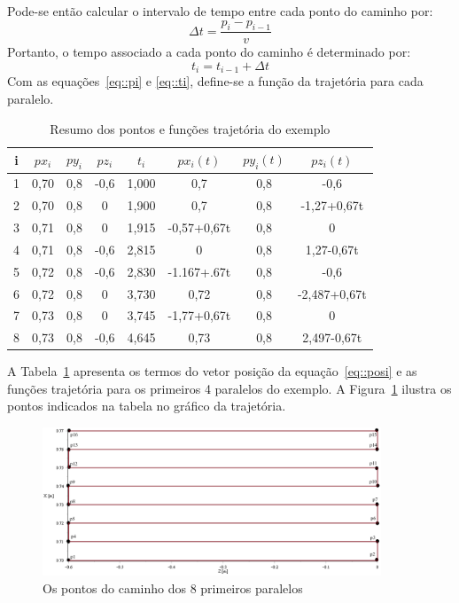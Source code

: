 Pode-se então calcular o intervalo de tempo entre cada ponto do caminho por:
%
\begin{equation} \label{eq::dt}
	\Delta t = \frac{p_i - p_{i-1}}{v}
\end{equation}
%
Portanto, o tempo associado a cada ponto do caminho é determinado por:
%
\begin{equation} \label{eq::ti}
	t_i = t_{i-1} + \Delta t
\end{equation}
%
Com as equações~\ref{eq::pi} e \ref{eq::ti}, define-se a função da trajetória
para cada paralelo.
%
\begin{table}[h]
\centering
\caption{Resumo dos pontos e funções trajetória do exemplo}
\label{tab::func_paralelos}
\begin{tabular}{|c|c|c|c|c||c|c|c|}
\hline
i & $px_i$ & $py_i$ & $pz_i$ & $t_i$  & $px_i(t)$    & $py_i(t)$ &
$pz_i(t)$
\\ \hline \hline
1       & 0,70  & 0,8   & -0,6  & 1,000 & 0,7         & 0,8      & -0,6         \\ \hline
2       & 0,70  & 0,8   & 0     & 1,900 & 0,7         & 0,8      & -1,27+0,67t  \\ \hline
3       & 0,71  & 0,8   & 0     & 1,915 & -0,57+0,67t & 0,8      & 0            \\ \hline
4       & 0,71  & 0,8   & -0,6  & 2,815 & 0           & 0,8      & 1,27-0,67t   \\ \hline
5       & 0,72  & 0,8   & -0,6  & 2,830 & -1.167+.67t & 0,8      & -0,6         \\ \hline
6       & 0,72  & 0,8   & 0     & 3,730 & 0,72        & 0,8      & -2,487+0,67t \\ \hline
7       & 0,73  & 0,8   & 0     & 3,745 & -1,77+0,67t & 0,8      & 0            \\ \hline
8       & 0,73  & 0,8   & -0,6  & 4,645 & 0,73        & 0,8      & 2,497-0,67t  \\ \hline
\end{tabular}
\end{table}
%

A Tabela~\ref{tab::func_paralelos} apresenta os termos do vetor posição da
equação~\ref{eq::posi} e as funções trajetória para os primeiros 4 paralelos do
exemplo. A Figura~\ref{fig::pontos_exemplo} ilustra os pontos indicados na
tabela no gráfico da trajetória.

\begin{figure}
	\centering 
 	\includegraphics[width=0.90\textwidth]{figs/pontos_exemplo}
 	\caption{Os pontos do caminho dos 8 primeiros paralelos}
 	\label{fig::pontos_exemplo}
\end{figure}

